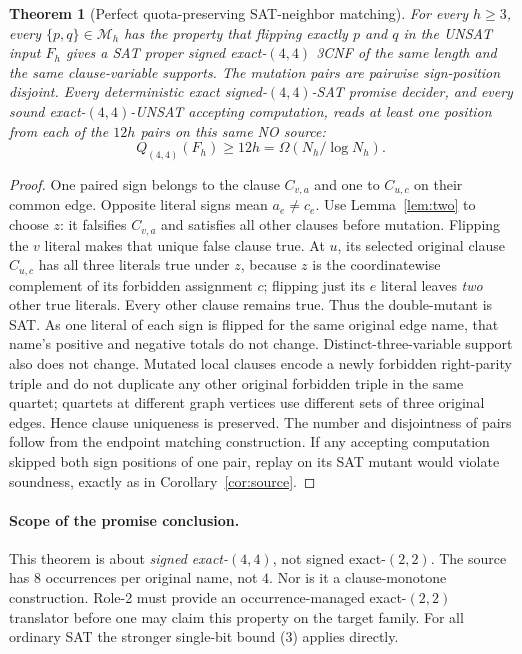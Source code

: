 \documentclass[11pt]{article}
\newtheorem{theorem}{Theorem}
\begin{document}
\begin{theorem}[Perfect quota-preserving SAT-neighbor matching]\label{th:matching}
For every $h\ge3$, every $\{p,q\}\in\mathcal M_h$ has the property that flipping \emph{exactly} $p$ and $q$ in the UNSAT input $F_h$ gives a SAT proper signed exact-$(4,4)$ 3CNF of the same length and the same clause-variable supports. The mutation pairs are pairwise sign-position disjoint. Every deterministic exact signed-$(4,4)$-SAT promise decider, and every sound exact-$(4,4)$-UNSAT accepting computation, reads at least one position from each of the $12h$ pairs on this \emph{same} NO source:
\[
                          Q_{(4,4)}(F_h)\ge12h=\Omega(N_h/\log N_h).\tag{5}
\]
\end{theorem}
\begin{proof}
One paired sign belongs to the clause $C_{v,a}$ and one to $C_{u,c}$ on their common edge. Opposite literal signs mean $a_e\ne c_e$. Use Lemma~\ref{lem:two} to choose $z$: it falsifies $C_{v,a}$ and satisfies all other clauses before mutation. Flipping the $v$ literal makes that unique false clause true. At $u$, its selected original clause $C_{u,c}$ has all three literals true under $z$, because $z$ is the coordinatewise complement of its forbidden assignment $c$; flipping just its $e$ literal leaves \emph{two} other true literals. Every other clause remains true. Thus the double-mutant is SAT. As one literal of each sign is flipped for the same original edge name, that name's positive and negative totals do not change. Distinct-three-variable support also does not change. Mutated local clauses encode a newly forbidden right-parity triple and do not duplicate any other original forbidden triple in the same quartet; quartets at different graph vertices use different sets of three original edges. Hence clause uniqueness is preserved. The number and disjointness of pairs follow from the endpoint matching construction. If any accepting computation skipped both sign positions of one pair, replay on its SAT mutant would violate soundness, exactly as in Corollary~\ref{cor:source}.\end{proof}

\paragraph{Scope of the promise conclusion.} This theorem is about \emph{signed exact-$(4,4)$}, not signed exact-$(2,2)$. The source has $8$ occurrences per original name, not $4$. Nor is it a clause-monotone construction. Role-2 must provide an occurrence-managed exact-$(2,2)$ translator before one may claim this property on the target family. For all ordinary SAT the stronger single-bit bound (3) applies directly.
\end{document}
